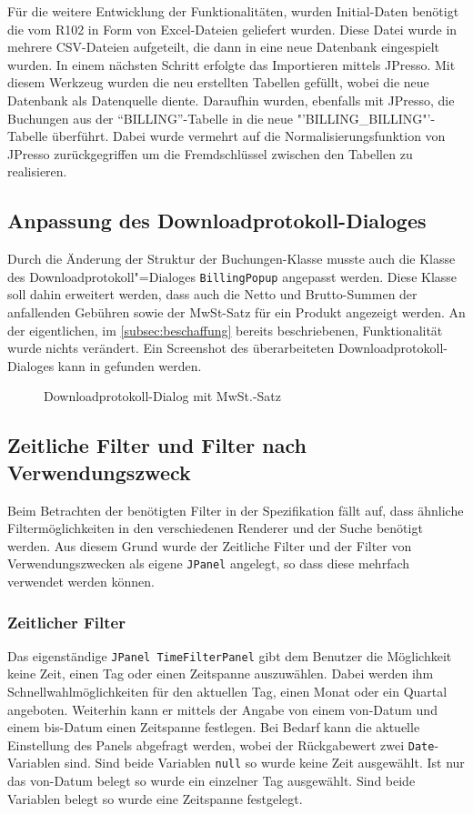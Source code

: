 Für die weitere Entwicklung der Funktionalitäten, wurden Initial-Daten benötigt die vom R102 in Form von Excel-Dateien geliefert wurden. Diese Datei wurde in mehrere CSV-Dateien aufgeteilt, die dann in eine neue Datenbank eingespielt wurden. In einem nächsten Schritt erfolgte das Importieren mittels JPresso. Mit diesem Werkzeug wurden die neu erstellten Tabellen gefüllt, wobei die neue Datenbank als Datenquelle diente. Daraufhin wurden, ebenfalls mit JPresso, die Buchungen aus der "`BILLING"'-Tabelle in die neue "'BILLING\_BILLING"'-Tabelle überführt. Dabei wurde vermehrt auf die Normalisierungsfunktion von JPresso zurückgegriffen um die Fremdschlüssel zwischen den Tabellen zu realisieren.

\subsection{Anpassung des Downloadprotokoll-Dialoges}
Durch die Änderung der Struktur der Buchungen-Klasse musste auch die Klasse des Downloadprotokoll"=Dialoges \lstinline|BillingPopup| angepasst werden.
Diese Klasse soll dahin erweitert werden, dass auch die Netto und Brutto-Summen der anfallenden Gebühren sowie der MwSt-Satz für ein Produkt angezeigt werden. An der eigentlichen, im \autoref{subsec:beschaffung} bereits beschriebenen, Funktionalität wurde nichts verändert. Ein Screenshot des überarbeiteten Downloadprotokoll-Dialoges kann in  gefunden werden.

\begin{figure}[htb]
	\centering
	\caption{Downloadprotokoll-Dialog mit MwSt.-Satz}
	\label{fig:alkis-protocol-new}
\end{figure}

\subsection{Zeitliche Filter und Filter nach Verwendungszweck}
Beim Betrachten der benötigten Filter in der Spezifikation fällt auf, dass ähnliche Filtermöglichkeiten in den verschiedenen Renderer und der Suche benötigt werden. Aus diesem Grund wurde der Zeitliche Filter und der Filter von Verwendungszwecken als eigene \lstinline|JPanel| angelegt, so dass diese mehrfach verwendet werden können.

\subsubsection{Zeitlicher Filter}
Das eigenständige \lstinline|JPanel TimeFilterPanel| gibt dem Benutzer die Möglichkeit keine Zeit, einen Tag oder einen Zeitspanne auszuwählen. Dabei werden ihm Schnellwahlmöglichkeiten für den aktuellen Tag, einen Monat oder ein Quartal angeboten. Weiterhin kann er mittels der Angabe von einem von-Datum und einem bis-Datum einen Zeitspanne festlegen. Bei Bedarf kann die aktuelle Einstellung des Panels abgefragt werden, wobei der Rückgabewert zwei \lstinline|Date|-Variablen sind. Sind beide Variablen \lstinline|null| so wurde keine Zeit ausgewählt. Ist nur das von-Datum belegt so wurde ein einzelner Tag ausgewählt. Sind beide Variablen belegt so wurde eine Zeitspanne festgelegt.

